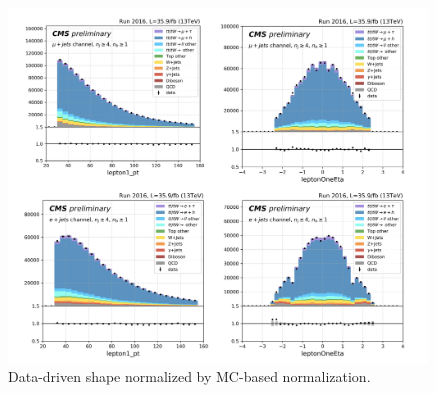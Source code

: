 \begin{figure}
    \centering
    \includegraphics[width=0.99\textwidth]{chapters/Appendix/sectionQCD/figures/application/mcNorm_ddShape.png}
    \caption{Data-driven shape normalized by MC-based normalization.}
    \label{fig:app:QCD:application_mcNorm_ddShape}
\end{figure}
\FloatBarrier